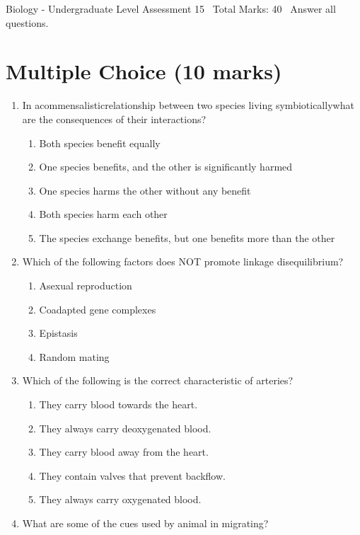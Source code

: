 \documentclass[12pt]{article}
\begin{document}
\begin{center}
Biology - Undergraduate Level Assessment 15 \
Total Marks: 40 \
Answer all questions.
\end{center}

\section*{Multiple Choice (10 marks)}
\begin{enumerate}[label=\arabic*.]
\item In acommensalisticrelationship between two species living symbioticallywhat are the consequences of their interactions?
\begin{enumerate}[label=(\alph*)]
    \item Both species benefit equally
    \item One species benefits, and the other is significantly harmed
    \item One species harms the other without any benefit
    \item Both species harm each other
    \item The species exchange benefits, but one benefits more than the other
\end{enumerate}
\item Which of the following factors does NOT promote linkage disequilibrium?
\begin{enumerate}[label=(\alph*)]
    \item Asexual reproduction
    \item Coadapted gene complexes
    \item Epistasis
    \item Random mating
\end{enumerate}
\item Which of the following is the correct characteristic of arteries?
\begin{enumerate}[label=(\alph*)]
    \item They carry blood towards the heart.
    \item They always carry deoxygenated blood.
    \item They carry blood away from the heart.
    \item They contain valves that prevent backflow.
    \item They always carry oxygenated blood.
\end{enumerate}
\item What are some of the cues used by animal in migrating?
\begin{enumerate}[label=(\alph*)]

\end{enumerate}
\end{enumerate}
\end{document}
